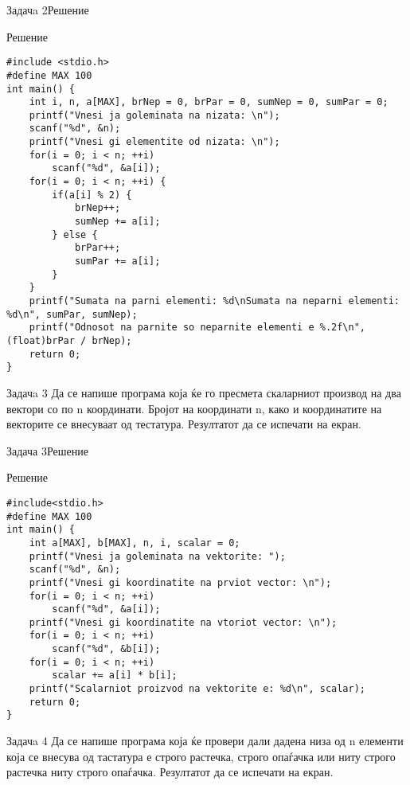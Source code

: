 \begin{frame}[fragile]{Задачa 2}{Решение} 
\begin{exampleblock}{Решение}
\begin{lstlisting}
#include <stdio.h>
#define MAX 100
int main() {
    int i, n, a[MAX], brNep = 0, brPar = 0, sumNep = 0, sumPar = 0;
    printf("Vnesi ja goleminata na nizata: \n");
    scanf("%d", &n);
    printf("Vnesi gi elementite od nizata: \n");
    for(i = 0; i < n; ++i)
        scanf("%d", &a[i]);
    for(i = 0; i < n; ++i) {
        if(a[i] % 2) {
            brNep++;
            sumNep += a[i];
        } else {
            brPar++;
            sumPar += a[i];
        }
    }
    printf("Sumata na parni elementi: %d\nSumata na neparni elementi: %d\n", sumPar, sumNep);
    printf("Odnosot na parnite so neparnite elementi e %.2f\n", (float)brPar / brNep);
    return 0;
}
\end{lstlisting}
\end{exampleblock}
\end{frame}

\begin{frame}{Задачa 3}
Да се напише програма која ќе го пресмета скаларниот производ на два вектори со по n координати. 
Бројот на координати n, како и координатите на векторите се внесуваат од
тестатура. Резултатот да се испечати на екран.
\end{frame}

\begin{frame}[fragile]{Задача 3}{Решение} 
\begin{exampleblock}{Решение}
\begin{lstlisting}
#include<stdio.h>
#define MAX 100
int main() {
    int a[MAX], b[MAX], n, i, scalar = 0;
    printf("Vnesi ja goleminata na vektorite: ");
    scanf("%d", &n);
    printf("Vnesi gi koordinatite na prviot vector: \n");
    for(i = 0; i < n; ++i)
        scanf("%d", &a[i]);
    printf("Vnesi gi koordinatite na vtoriot vector: \n");
    for(i = 0; i < n; ++i)
        scanf("%d", &b[i]);
    for(i = 0; i < n; ++i)
        scalar += a[i] * b[i];
    printf("Scalarniot proizvod na vektorite e: %d\n", scalar);
    return 0;
}
\end{lstlisting}
\end{exampleblock}
\end{frame}

\begin{frame}{Задачa 4}
Да се напише програма која ќе провери дали дадена низа од n елементи која се
внесува од тастатура е строго растечка, строго опаѓачка или ниту строго растечка
ниту строго опаѓачка. Резултатот да се испечати на екран.
\end{frame}

